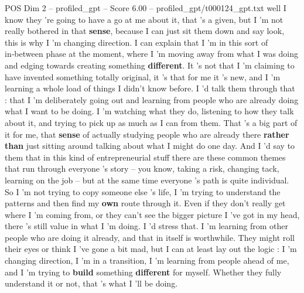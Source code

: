 \begin{textsample}{POS Dim 2 – profiled\_gpt – Score 6.00 – profiled\_gpt/t000124\_gpt.txt}  \label{ex:f2_pos_019}
well I know they 're going to have a go at me about it, that ’s a given, but I ’m not really bothered in that \textbf{sense}, because I can just sit them down and say look, this is why I ’m changing direction.
I can explain that I ’m in this sort of in‑between phase at the moment, where I ’m moving away from what I was doing and edging towards creating something \textbf{different}.
It ’s not that I ’m claiming to have invented something totally original, it ’s that for me it ’s new, and I ’m learning a whole load of things I didn't know before.
I ’d talk them through that : that I ’m deliberately going out and learning from people who are already doing what I want to be doing.
I ’m watching what they do, listening to how they talk about it, and trying to pick up as much as I can from them.
That ’s a big part of it for me, that \textbf{sense} of actually studying people who are already there \textbf{rather} \textbf{than} just sitting around talking about what I might do one day.
And I ’d say to them that in this kind of entrepreneurial stuff there are these common themes that run through everyone ’s story – you know, taking a risk, changing tack, learning on the job – but at the same time everyone ’s path is quite individual.
So I ’m not trying to copy someone else ’s life, I ’m trying to understand the patterns and then find my \textbf{own} route through it.
Even if they don't really get where I ’m coming from, or they can't see the bigger picture I ’ve got in my head, there ’s still value in what I ’m doing.
I ’d stress that.
I ’m learning from other people who are doing it already, and that in itself is worthwhile.
They might roll their eyes or think I ’ve gone a bit mad, but I can at least lay out the logic : I ’m changing direction, I ’m in a transition, I ’m learning from people ahead of me, and I ’m trying to \textbf{build} something \textbf{different} for myself.
Whether they fully understand it or not, that ’s what I ’ll be doing.

\end{textsample}
